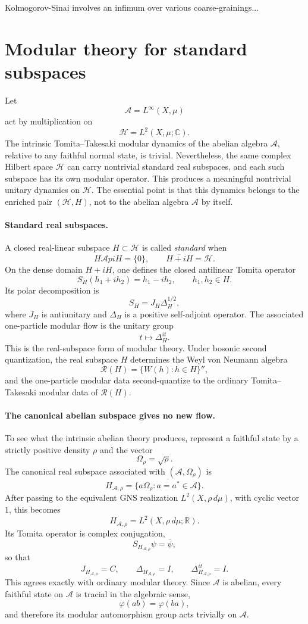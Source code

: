 \documentclass[a4paper,11pt]{article}
\theoremstyle{definition}
\newcommand{\cH}{\mathcal{H}}
\begin{document}
Kolmogorov-Sinai involves an infimum over various coarse-grainings...


\section{Modular theory for standard subspaces}


Let
\[
    \mathcal{A}=L^\infty(X,\mu)
\]
act by multiplication on
\[
    \cH=L^2(X,\mu;\mathbb{C}).
\]
The intrinsic Tomita--Takesaki modular dynamics of the abelian algebra \(\mathcal{A}\), relative to any faithful normal state, is trivial. Nevertheless, the same complex Hilbert space \(\cH\) can carry nontrivial standard real subspaces, and each such subspace has its own modular operator. This produces a meaningful nontrivial unitary dynamics on \(\cH\). The essential point is that this dynamics belongs to the enriched pair \((\cH,H)\), not to the abelian algebra \(\mathcal{A}\) by itself.

\paragraph{Standard real subspaces.}
A closed real-linear subspace \(H\subset\cH\) is called \emph{standard} when
\[
    H\mathcal{A}p iH=\{0\},
    \qquad
    \overline{H+iH}=\cH.
\]
On the dense domain \(H+iH\), one defines the closed antilinear Tomita operator
\[
    S_H(h_1+ih_2)=h_1-ih_2,
    \qquad h_1,h_2\in H.
\]
Its polar decomposition is
\[
    S_H=J_H\Delta_H^{1/2},
\]
where \(J_H\) is antiunitary and \(\Delta_H\) is a positive self-adjoint operator. The associated one-particle modular flow is the unitary group
\[
    t\longmapsto \Delta_H^{it}.
\]
This is the real-subspace form of modular theory. Under bosonic second quantization, the real subspace \(H\) determines the Weyl von Neumann algebra
\[
    \mathcal{R}(H)=\{W(h):h\in H\}'',
\]
and the one-particle modular data second-quantize to the ordinary Tomita--Takesaki modular data of \(\mathcal{R}(H)\).

\paragraph{The canonical abelian subspace gives no new flow.}
To see what the intrinsic abelian theory produces, represent a faithful state by a strictly positive density \(\rho\) and the vector
\[
    \Omega_\rho=\sqrt{\rho}.
\]
The canonical real subspace associated with \((\mathcal{A},\Omega_\rho)\) is
\[
    H_{\mathcal{A},\rho}
    =\overline{\{a\Omega_\rho:a=a^*\in\mathcal{A}\}}.
\]
After passing to the equivalent GNS realization \(L^2(X,\rho\,d\mu)\), with cyclic vector \(1\), this becomes
\[
    H_{\mathcal{A},\rho}=L^2(X,\rho\,d\mu;\mathbb{R}).
\]
Its Tomita operator is complex conjugation,
\[
    S_{H_{\mathcal{A},\rho}}\psi=\overline{\psi},
\]
so that
\[
    J_{H_{\mathcal{A},\rho}}=C,
    \qquad
    \Delta_{H_{\mathcal{A},\rho}}=I,
    \qquad
    \Delta_{H_{\mathcal{A},\rho}}^{it}=I.
\]
This agrees exactly with ordinary modular theory. Since \(\mathcal{A}\) is abelian, every faithful state on \(\mathcal{A}\) is tracial in the algebraic sense,
\[
    \varphi(ab)=\varphi(ba),
\]
and therefore its modular automorphism group acts trivially on \(\mathcal{A}\).
\end{document}
